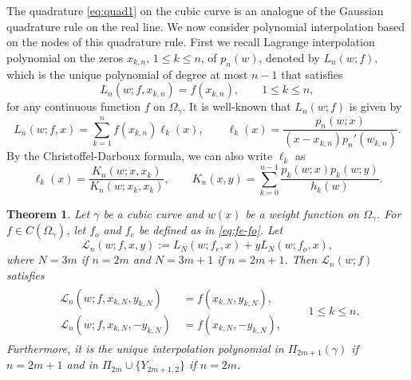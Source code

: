\documentclass{amsart}
\newtheorem{thm}{Theorem}[section]
\theoremstyle{remark}
\def\g{{\gamma}}
\def\CL{{\mathcal L}}
\begin{document}
The quadrature \eqref{eq:quad1} on the cubic curve is an analogue of the Gaussian quadrature rule on the
real line. We now consider polynomial interpolation based on the nodes of this quadrature rule. First we recall
Lagrange interpolation polynomial on the zeros $x_{k,n}$, $1 \le k \le n$, of $p_n(w)$, denoted by $L_n (w; f)$,
which is the unique polynomial of degree at most $n-1$ that satisfies
$$
   L_n (w; f, x_{k,n}) = f(x_{k,n}), \qquad 1 \le k \le n, 
$$
for any continuous function $f$ on $\Omega_\g$. It is well-known that $L_n(w; f)$ is given by
\begin{equation}\label{eq:LagrangeInte1}
  L_n (w;f,x) = \sum_{k=1}^n f(x_{k,n})\ell_k(x), \qquad \ell_k(x) = \frac{p_n(w;x)}{(x-x_{k,n}) p_n'(w_{k,n})}.
\end{equation}
By the Christoffel-Darboux formula, we can also write $\ell_k$ as
\begin{equation}\label{eq:LagrangeInte2}
  \ell_k(x) = \frac{K_n(w; x,x_k)}{K_n(w; x_k,x_k)}, \qquad K_n(x,y) = \sum_{k=0}^{n-1} \frac{p_k(w;x)p_k(w;y)}{h_k(w)}. 
\end{equation}

\begin{thm}
Let $\g$ be a cubic curve and $w(x)$ be a weight function on $\Omega_\g$. For $f \in C(\Omega_\g)$, let 
$f_o$ and $f_e$ be defined as in \eqref{eq:fe-fo}. Let  
\begin{equation}\label{eq:interp}
   \CL_n (w; f, x,y):=  L_N (w; f_e, x) + y L_N(w; f_o, x),
\end{equation}
where $N =3m$ if $n = 2m$ and $N =3m+1$ if $n=2m+1$. Then $\CL_n(w;f)$ satisfies 
\begin{align*}
\begin{split}
  \CL_n(w; f, x_{k,N}, y_{k,N})  &\, = f(x_{k,N},y_{k,N}), \\ 
  \CL_n(w; f, x_{k,N}, - y_{k,N}) &\, = f(x_{k,N},- y_{k,N}),
\end{split}
\qquad 1 \le k\le n.
\end{align*}
Furthermore, it is the unique interpolation polynomial in $\Pi_{2m+1}(\g)$ if $n = 2m+1$ and in
$\Pi_{2m}\cup\{ Y_{2m+1,2}\}$ if $n = 2m$. 
\end{thm}
\end{document}
